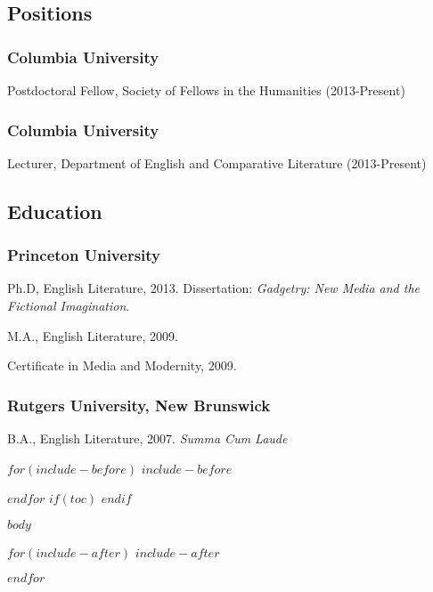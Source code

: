 \documentclass[11pt]{article}
\begin{document}
\bigskip\bigskip\medskip
{}
\reversemarginpar
\bigskip 

\subsection{Positions}

\subsubsection{Columbia University}
Postdoctoral Fellow, Society of Fellows in the Humanities (2013-Present)

\subsubsection{Columbia University}
Lecturer, Department of English and Comparative Literature (2013-Present)

\medskip

\subsection{Education}

\subsubsection{Princeton University}

Ph.D, English Literature, 2013.
\ind Dissertation: \emph{Gadgetry: New Media and the Fictional Imagination}. 

M.A., English Literature, 2009.

Certificate in Media and Modernity, 2009. %

\medskip
\subsubsection{Rutgers University, New Brunswick}

B.A., English Literature, 2007. \emph{Summa Cum Laude} %

$for(include-before)$
$include-before$

$endfor$
$if(toc)$
\tableofcontents
$endif$

$body$

$for(include-after)$
$include-after$

$endfor$
\end{document}
